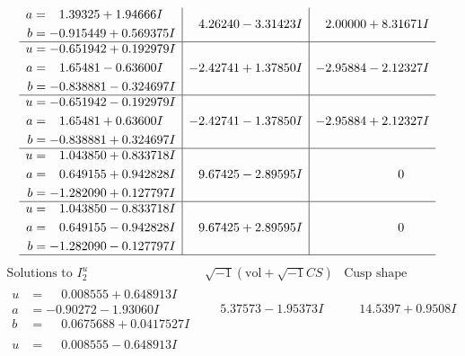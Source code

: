\documentclass[1p]{elsarticle_modified}
\theoremstyle{definition}
\newcommand{\I}{\sqrt{-1}}
\begin{document}
$$\begin{array}{c|c|c}
\begin{aligned}
a &= \phantom{-}1.39325 + 1.94666 I \\
b &= -0.915449 + 0.569375 I\end{aligned}
 & \phantom{-}4.26240 - 3.31423 I & \phantom{-}2.00000 + 8.31671 I \\ \hline\begin{aligned}
u &= -0.651942 + 0.192979 I \\
a &= \phantom{-}1.65481 - 0.63600 I \\
b &= -0.838881 - 0.324697 I\end{aligned}
 & -2.42741 + 1.37850 I & -2.95884 - 2.12327 I \\ \hline\begin{aligned}
u &= -0.651942 - 0.192979 I \\
a &= \phantom{-}1.65481 + 0.63600 I \\
b &= -0.838881 + 0.324697 I\end{aligned}
 & -2.42741 - 1.37850 I & -2.95884 + 2.12327 I \\ \hline\begin{aligned}
u &= \phantom{-}1.043850 + 0.833718 I \\
a &= \phantom{-}0.649155 + 0.942828 I \\
b &= -1.282090 + 0.127797 I\end{aligned}
 & \phantom{-}9.67425 - 2.89595 I & \phantom{-0.000000 } 0 \\ \hline\begin{aligned}
u &= \phantom{-}1.043850 - 0.833718 I \\
a &= \phantom{-}0.649155 - 0.942828 I \\
b &= -1.282090 - 0.127797 I\end{aligned}
 & \phantom{-}9.67425 + 2.89595 I & \phantom{-0.000000 } 0\\
 \hline 
 \end{array}$$\newpage$$\begin{array}{c|c|c}  
\text{Solutions to }I^u_{2}& \I (\text{vol} + \sqrt{-1}CS) & \text{Cusp shape}\\
 \hline 
\begin{aligned}
u &= \phantom{-}0.008555 + 0.648913 I \\
a &= -0.90272 - 1.93060 I \\
b &= \phantom{-}0.0675688 + 0.0417527 I\end{aligned}
 & \phantom{-}5.37573 - 1.95373 I & \phantom{-}14.5397 + 0.9508 I \\ \hline\begin{aligned}
u &= \phantom{-}0.008555 - 0.648913 I \\

\end{aligned}
\end{array}$$
\end{document}
